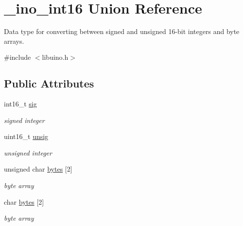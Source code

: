 \hypertarget{union__ino__int16}{\section{\-\_\-ino\-\_\-int16 \-Union \-Reference}
\label{union__ino__int16}
}


\-Data type for converting between signed and unsigned 16-\/bit integers and byte arrays.  




{\ttfamily \#include $<$libuino.\-h$>$}

\subsection*{\-Public \-Attributes}
\begin{DoxyCompactItemize}
\item 
\hypertarget{union__ino__int16_acfe03b76a9a4e42e580d875b2c4a816f}{int16\-\_\-t \hyperlink{union__ino__int16_acfe03b76a9a4e42e580d875b2c4a816f}{sig}}\label{union__ino__int16_acfe03b76a9a4e42e580d875b2c4a816f}

\begin{DoxyCompactList}\small\item\em signed integer \end{DoxyCompactList}\item 
\hypertarget{union__ino__int16_a7d36a610241ced31f5b208b31fa9d66d}{uint16\-\_\-t \hyperlink{union__ino__int16_a7d36a610241ced31f5b208b31fa9d66d}{unsig}}\label{union__ino__int16_a7d36a610241ced31f5b208b31fa9d66d}

\begin{DoxyCompactList}\small\item\em unsigned integer \end{DoxyCompactList}\item 
\hypertarget{union__ino__int16_a50a124db498fe88ca9312b31c2e060b5}{unsigned char \hyperlink{union__ino__int16_a50a124db498fe88ca9312b31c2e060b5}{bytes} \mbox{[}2\mbox{]}}\label{union__ino__int16_a50a124db498fe88ca9312b31c2e060b5}

\begin{DoxyCompactList}\small\item\em byte array \end{DoxyCompactList}\item 
\hypertarget{union__ino__int16_ade1a284c1babbdcd4b328f37b1fb255c}{char \hyperlink{union__ino__int16_ade1a284c1babbdcd4b328f37b1fb255c}{bytes} \mbox{[}2\mbox{]}}\label{union__ino__int16_ade1a284c1babbdcd4b328f37b1fb255c}

\begin{DoxyCompactList}\small\item\em byte array \end{DoxyCompactList}\end{DoxyCompactItemize}



